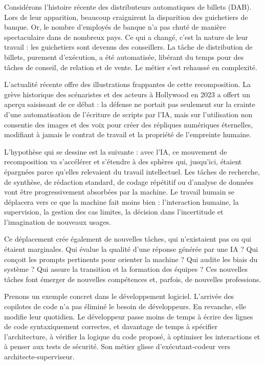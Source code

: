 Considérons l'histoire récente des distributeurs automatiques de billets (DAB). Lors de leur apparition, beaucoup craignirent la disparition des guichetiers de banque. Or, le nombre d'employés de banque n'a pas chuté de manière spectaculaire dans de nombreux pays. Ce qui a changé, c'est la nature de leur travail : les guichetiers sont devenus des conseillers. La tâche de distribution de billets, purement d'exécution, a été automatisée, libérant du temps pour des tâches de conseil, de relation et de vente. Le métier s'est rehaussé en complexité.

L'actualité récente offre des illustrations frappantes de cette recomposition. La grève historique des scénaristes et des acteurs à Hollywood en 2023 a offert un aperçu saisissant de ce débat : la défense ne portait pas seulement sur la crainte d'une automatisation de l'écriture de scripts par l'IA, mais sur l'utilisation non consentie des images et des voix pour créer des répliques numériques éternelles, modifiant à jamais le contrat de travail et la propriété de l'empreinte humaine.

L'hypothèse qui se dessine est la suivante : avec l'IA, ce mouvement de recomposition va s'accélérer et s'étendre à des sphères qui, jusqu'ici, étaient épargnées parce qu'elles relevaient du travail intellectuel. Les tâches de recherche, de synthèse, de rédaction standard, de codage répétitif ou d'analyse de données vont être progressivement absorbées par la machine. Le travail humain se déplacera vers ce que la machine fait moins bien : l'interaction humaine, la supervision, la gestion des cas limites, la décision dans l'incertitude et l'imagination de nouveaux usages.

Ce déplacement crée également de nouvelles tâches, qui n'existaient pas ou qui étaient marginales. Qui évalue la qualité d'une réponse générée par une IA ? Qui conçoit les prompts pertinents pour orienter la machine ? Qui audite les biais du système ? Qui assure la transition et la formation des équipes ? Ces nouvelles tâches font émerger de nouvelles compétences et, parfois, de nouvelles professions.

Prenons un exemple concret dans le développement logiciel. L'arrivée des copilotes de code n'a pas éliminé le besoin de développeurs. En revanche, elle modifie leur quotidien. Le développeur passe moins de temps à écrire des lignes de code syntaxiquement correctes, et davantage de temps à spécifier l'architecture, à vérifier la logique du code proposé, à optimiser les interactions et à penser aux tests de sécurité. Son métier glisse d'exécutant-codeur vers architecte-superviseur.

